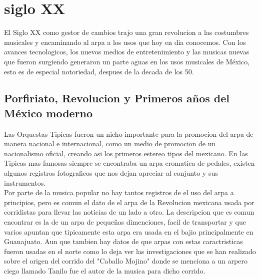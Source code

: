\section{siglo XX}
El Siglo XX como gestor de cambios trajo una gran revolucion a las costumbres musicales y encaminando al arpa a los usos que hoy en dia conocemos. Con los avances tecnologicos, los nuevos medios de entretenimiento y las musicas nuevas que fueron surgiendo generaron un parte aguas en los usos musicales de México, esto es de especial notoriedad, despues de la decada de los 50.

\subsection{Porfiriato, Revolucion y Primeros años del México moderno}
Las Orquestas Tipicas fueron un nicho importante para la promocion del arpa de manera nacional e internacional, como un medio de promocion de un nacionalismo oficial, creando asi los primeros estereo tipos del mexicano. En las Tipicas mas famosas siempre se encontraba un arpa cromatica de pedales, existen algunos registros fotograficos que nos dejan apreciar al conjunto y sus instrumentos.
\\
Por parte de la musica popular no hay tantos registros de el uso del arpa a principios, pero es comun el dato de el arpa de la Revolucion mexicana usada por corridistas para llevar las noticias de un lado a otro. La descripcion que es comun encontrar es la de un arpa de pequeñas dimenciones, facil de transportar y que varios apuntan que tipicamente esta arpa era usada en el bajio principalmente en Guanajuato. Aun que tambien hay datos de que arpas con estas caractristicas fueron usadas en el norte como lo deja ver las investigaciones que se han realizado sobre el origen del corrido del "Caballo Mojino" donde se menciona  a un arpero ciego llamado Tanilo fue el autor de la musica para dicho corrido. 